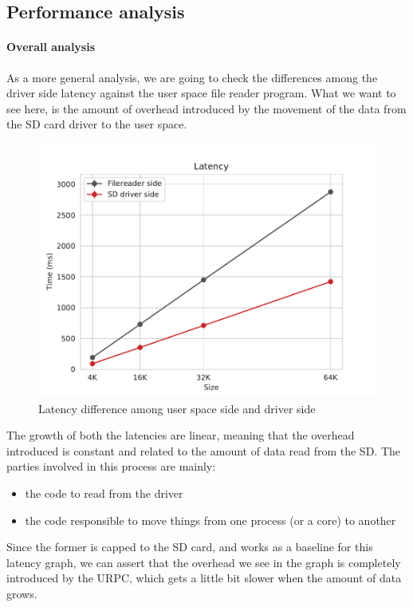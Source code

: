 \documentclass[a4paper,twoside,openright]{report}
\begin{document}
\subsection{Performance analysis}
\label{sub:fs_perf_analysis}
\paragraph{Overall analysis}
As a more general analysis, we are going to check the differences among the driver side latency against the user space file reader program.
What we want to see here, is the amount of overhead introduced by the movement of the data from the SD card driver to the user space.
\begin{figure} [H]
	\centering
	\includegraphics[width=0.7\linewidth]{assets/fs_latency.pdf}
	\caption{Latency difference among user space side and driver side}
	\label{fig:fs_side_diff}
\end{figure}
The growth of both the latencies are linear, meaning that the overhead introduced is constant and related to the amount of data read from the SD.
The parties involved in this process are mainly:
\begin{itemize}
    \item the code to read from the driver
    \item the code responsible to move things from one process (or a core) to another
\end{itemize}
Since the former is capped to the SD card, and works as a baseline for this latency graph, we can assert that the overhead we see in the graph is completely introduced by the URPC, which gets a little bit slower when the amount of data grows.
\end{document}
